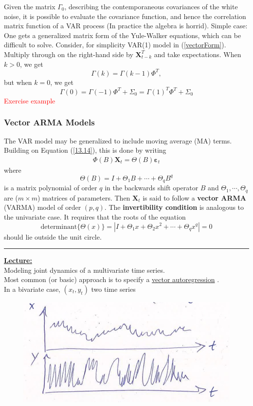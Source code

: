 Given the matrix $\Gamma_0$, describing the contemporaneous covariances of the white noise, it is possible to evaluate the covariance function, and hence the correlation matrix function of a VAR process (In practice the algebra is horrid). Simple case: One gets a generalized matrix form of the Yule-Walker equations, which can be difficult to solve. Consider, for simplicity VAR(1) model in (\ref{vectorForm}). Multiply through on the right-hand side by $\mathbf{X}_{t-k}^T$ and take expectations. When $k>0$, we get \[
\Gamma(k)=\Gamma(k-1) \Phi^T,
\] but when $k=0$, we get \[
\Gamma(0) =\Gamma(-1)\Phi^T + \Sigma_0 =\Gamma(1)^T \Phi^T + \Sigma_0
\]
\textcolor{red}{Exercise example}

\subsubsection{Vector ARMA Models}

The VAR model may be generalized to include moving average (MA) terms. Building on Equation (\ref{13.14}), this is done by writing \begin{align}
    \Phi (B) \mathbf{X}_t =\Theta(B)\mathbf{\varepsilon}_t
\end{align} where \[
\Theta(B)=I+\Theta_1 B+ \cdots + \Theta_q B^q
\] is a matrix polynomial of order $q$ in the backwards shift operator $B$ and $\Theta_1, \cdots, \Theta_q$ are ($m\times m$) matrices of parameters. Then $\mathbf{X}_t$ is said to follow a \textbf{vector ARMA} (VARMA) model of order $(p,q)$. The \textbf{invertibility condition} is analogous to the univariate case. It requires that the roots of the equation \[ 
\text{determinant}\{\Theta(x)\} =|I+\Theta_1 x + \Theta_2 x^2 + \cdots + \Theta_q x^q|=0
\] should lie outside the unit circle.
 
 \rule{\textwidth}{0.4pt}












\bigskip
\noindent
\textbf{\underline{Lecture:}}\\

Modeling joint dynamics of a multivariate time series.\\
\quad Most common (or basic) approach is to specify a \underline{vector autoregression} .\\

In a bivariate case, $(x_t,y_t) $ two time series
\begin{figure}[H]
    \centering
    \includegraphics[width=0.75\linewidth]{images/Screenshot 2024-05-21 at 18.18.51.jpg}
\end{figure}

